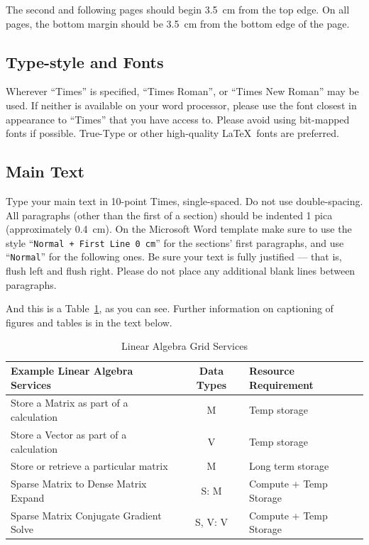 \documentclass[a4paper,twoside]{arlims}
\begin{document}
The second and following pages should begin 3.5~cm from the top edge.
On all pages, the bottom margin should be 3.5~cm from the bottom edge
of the page.

\subsection{Type-style and Fonts}
\label{sect:Fonts}

Wherever ``Times'' is specified, ``Times Roman'', or ``Times New
Roman'' may be used. If neither is available on your word processor,
please use the font closest in appearance to ``Times'' that you have
access to. Please avoid using bit-mapped fonts if possible. True-Type
or other high-quality \LaTeX\ fonts are preferred.

\subsection{Main Text}
\label{sect:MainText}

Type your main text in 10-point Times, single-spaced.  Do not use
double-spacing. All paragraphs (other than the first of a section)
should be indented 1 pica (approximately 0.4~cm). On the Microsoft
Word template make sure to use the style ``\texttt{Normal + First Line
  0 cm}'' for the sections' first paragraphs, and use
``\texttt{Normal}'' for the following ones. Be sure your text is fully
justified --- that is, flush left and flush right. Please do not place
any additional blank lines between paragraphs.

And this is a Table~\ref{tab:LINALG}, as you can see. Further
information on captioning of figures and tables is in the text below.

\begin{table}[htbp]
  \caption{Linear Algebra Grid Services}
  \centering
  \begin{tabular}{|l|c|l|}
    \hline
    \textbf{Example Linear Algebra Services} & \textbf{Data Types} & \textbf{Resource Requirement} \\
    \hline
    Store a Matrix as part of a calculation  & M          &   Temp storage            \\
    Store a Vector as part of a calculation  & V          &   Temp storage            \\
    Store or retrieve a particular matrix    & M          &   Long term storage       \\
    Sparse Matrix to Dense Matrix Expand     & S: M       &   Compute + Temp Storage  \\
    Sparse Matrix Conjugate Gradient Solve   & S, V: V    &   Compute + Temp Storage  \\
    \hline
  \end{tabular}
  \label{tab:LINALG}
\end{table}
\end{document}
